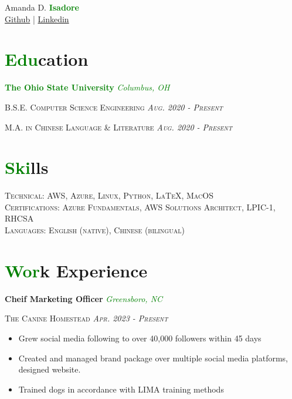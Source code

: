 \documentclass[11pt]{article}
\begin{document}
\begin{center}\Huge Amanda D. \textbf{\textcolor{green}{Isadore}}\\
\vspace{1mm}
\small \href{https://github.com/AdalineCooper}{Github} | \href{www.linkedin.com/in/aglingua}{Linkedin}
\end{center}

\section*{\textcolor{green}{Edu}cation}
\textbf{\textcolor{green}{The Ohio State University}} \hfill \textcolor{green}{\textit{Columbus, OH}}

\noindent \textsc{B.S.E. Computer Science Engineering \hfill {\textit{Aug. 2020 - Present}}}

\noindent \textsc{M.A. in Chinese Language \& Literature \hfill {\textit{Aug. 2020 - Present}}}

\section*{\textcolor{green}{Ski}lls}
\textsc{Technical: AWS, Azure, Linux, Python, \LaTeX, MacOS\\
Certifications: Azure Fundamentals, AWS Solutions Architect, LPIC-1, RHCSA\\
Languages: English (native), Chinese (bilingual)}

\section*{\textcolor{green}{Wor}k Experience}

\noindent \textbf{Cheif Marketing Officer} \hfill \textcolor{green}{\textit{Greensboro, NC}}

\noindent \textsc{The Canine Homestead \hfill {\textit{Apr. 2023 - Present}}}
\vspace{-2mm}
\begin{itemize}
    \setlength{\itemsep}{0cm}
    \setlength{\parskip}{0cm}
    \addtolength{\leftskip}{-5mm}
    \item Grew social media following to over 40,000 followers within 45 days
    \item Created and managed brand package over multiple social media platforms, designed website.
    \item Trained dogs in accordance with LIMA training methods
\end{itemize}
\end{document}
